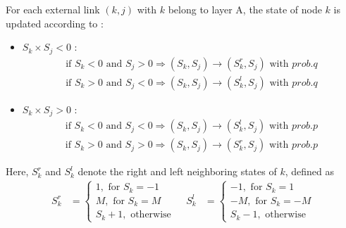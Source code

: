 \documentclass[english]{cccconf}
\begin{document}
For each external link $(k,j)$ with $k$ belong to layer A, the state of node $k$ is updated according to :
\begin{itemize}
\item $S_k \times S_j < 0$ :
\begin{align*}
\mbox{if } S_k<0 \mbox{ and } S_j>0  \Rightarrow (S_k, S_j) \rightarrow (S_k^r, S_j) \mbox{ with } prob.q\\
\mbox{if } S_k>0 \mbox{ and } S_j<0  \Rightarrow (S_k, S_j) \rightarrow (S_k^l, S_j) \mbox{ with } prob.q
\end{align*}
\item $S_k \times S_j > 0$ :
\begin{align*}
\mbox{if } S_k<0 \mbox{ and } S_j<0  \Rightarrow (S_k, S_j) \rightarrow (S_k^l, S_j) \mbox{ with } prob.p\\
\mbox{if } S_k>0 \mbox{ and } S_j>0  \Rightarrow (S_k, S_j) \rightarrow (S_k^r, S_j) \mbox{ with } prob.p
\end{align*}
\end{itemize}
Here, $S_k^r$ and $S_k^l$ denote the right and left neighboring states of $k$, defined as
\begin{align*}
S_k^r &= \left\{\begin{matrix}
1,\mbox{ for } S_k= -1
\\ M,\mbox{ for } S_k=M
\\ S_k + 1,\mbox{ otherwise } 
\end{matrix}\right. &
S_k^l &= \left\{\begin{matrix}
-1,\mbox{ for } S_k= 1
\\ -M,\mbox{ for } S_k=-M
\\ S_k - 1,\mbox{ otherwise } 
\end{matrix}\right.
\end{align*}
\end{document}

